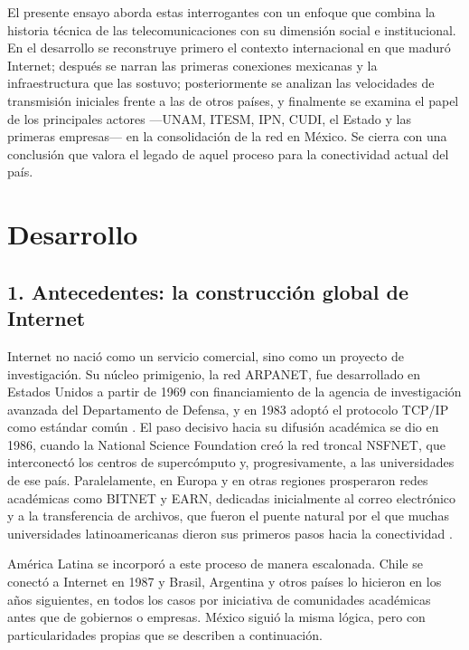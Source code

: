 \documentclass[11pt,a4paper]{article}
\begin{document}
El presente ensayo aborda estas interrogantes con un enfoque que combina la
historia técnica de las telecomunicaciones con su dimensión social e
institucional. En el desarrollo se reconstruye primero el contexto
internacional en que maduró Internet; después se narran las primeras
conexiones mexicanas y la infraestructura que las sostuvo; posteriormente se
analizan las velocidades de transmisión iniciales frente a las de otros
países, y finalmente se examina el papel de los principales actores —UNAM,
ITESM, IPN, CUDI, el Estado y las primeras empresas— en la consolidación de
la red en México. Se cierra con una conclusión que valora el legado de aquel
proceso para la conectividad actual del país.

\section*{Desarrollo}

\subsection*{1. Antecedentes: la construcción global de Internet}

Internet no nació como un servicio comercial, sino como un proyecto de
investigación. Su núcleo primigenio, la red ARPANET, fue desarrollado en
Estados Unidos a partir de 1969 con financiamiento de la agencia de
investigación avanzada del Departamento de Defensa, y en 1983 adoptó el
protocolo TCP/IP como estándar común \cite{abbate}. El paso decisivo hacia
su difusión académica se dio en 1986, cuando la National Science Foundation
creó la red troncal NSFNET, que interconectó los centros de supercómputo y,
progresivamente, a las universidades de ese país. Paralelamente, en Europa y
en otras regiones prosperaron redes académicas como BITNET y EARN, dedicadas
inicialmente al correo electrónico y a la transferencia de archivos, que
fueron el puente natural por el que muchas universidades latinoamericanas
dieron sus primeros pasos hacia la conectividad \cite{hauben}.

América Latina se incorporó a este proceso de manera escalonada. Chile se
conectó a Internet en 1987 y Brasil, Argentina y otros países lo hicieron en
los años siguientes, en todos los casos por iniciativa de comunidades
académicas antes que de gobiernos o empresas. México siguió la misma lógica,
pero con particularidades propias que se describen a continuación.
\end{document}
